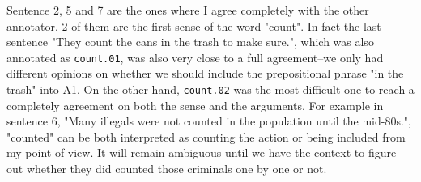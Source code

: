 \documentclass[11pt]{article} %
\begin{document}
Sentence 2, 5 and 7 are the ones where I agree completely with the other annotator. 2 of them are the first sense of the word "count". In fact the last sentence "They count the cans in the trash to make sure.", which was also annotated as \texttt{count.01}, was also very close to a full agreement--we only had different opinions on whether we should include the prepositional phrase "in the trash" into A1. On the other hand, \texttt{count.02} was the most difficult one to reach a completely agreement on both the sense and the arguments. For example in sentence 6, "Many illegals were not counted in the population until the mid-80s.", "counted" can be both interpreted as counting the action or being included from my point of view. It will remain ambiguous until we have the context to figure out whether they did counted those criminals one by one or not.

\printbibliography
\end{document}
